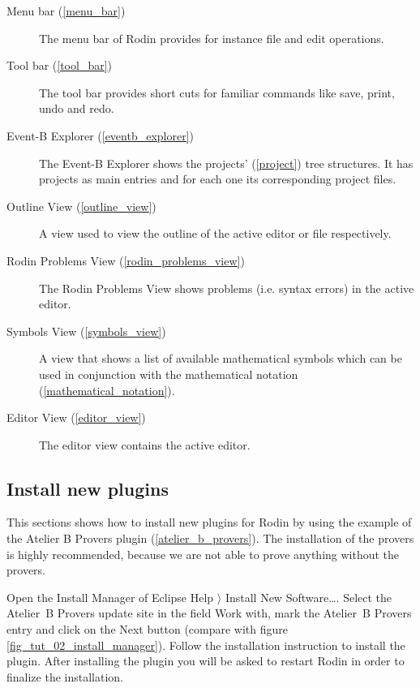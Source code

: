 \begin{description}
	\item[Menu bar (\ref{menu_bar})] The menu bar of Rodin provides for instance file and edit operations.
	\item[Tool bar (\ref{tool_bar})] The tool bar provides short cuts for familiar commands like save, print, undo and redo.
	\item[Event-B Explorer (\ref{eventb_explorer})] The Event-B Explorer shows the projects' (\ref{project}) tree structures. It has projects as main entries and for each one its corresponding project files.
	\item[Outline View (\ref{outline_view})] A view used to view the outline of the active editor or file respectively.
	\item[Rodin Problems View (\ref{rodin_problems_view})] The Rodin Problems View shows problems (i.e. syntax errors) in the active editor.
	\item[Symbols View (\ref{symbols_view})] A view that shows a list of available mathematical symbols which can be used in conjunction with the mathematical notation (\ref{mathematical_notation}).
	\item[Editor View (\ref{editor_view})] The editor view contains the active editor.
\end{description}

\subsection{Install new plugins}

This sections shows how to install new plugins for Rodin by using the example of the Atelier B Provers plugin (\ref{atelier_b_provers}). The installation of the provers is highly recommended, because we are not able to prove anything without the provers.

Open the Install Manager of Eclipse \textsf{Help $\rangle$ Install New Software\ldots}. Select the Atelier~B Provers update site in the field \textsf{Work with}, mark the Atelier~B Provers entry and click on the \textsf{Next} button (compare with figure \ref{fig_tut_02_install_manager}). Follow the installation instruction to install the plugin. After installing the plugin you will be asked to restart Rodin in order to finalize the installation.

